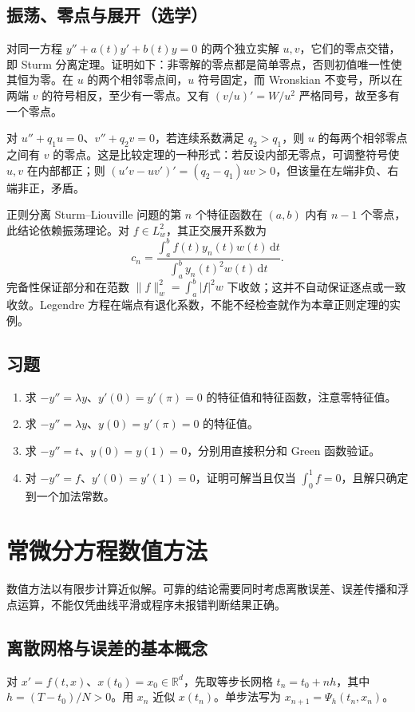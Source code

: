 \documentclass[UTF8,12pt,a4paper,fontset=fandol]{ctexbook}
\begin{document}
\section{振荡、零点与展开（选学）}
对同一方程 $y''+a(t)y'+b(t)y=0$ 的两个独立实解 $u,v$，它们的零点交错，即 Sturm 分离定理。证明如下：非零解的零点都是简单零点，否则初值唯一性使其恒为零。在 $u$ 的两个相邻零点间，$u$ 符号固定，而 Wronskian 不变号，所以在两端 $v$ 的符号相反，至少有一零点。又有 $(v/u)'=W/u^2$ 严格同号，故至多有一个零点。

对 $u''+q_1u=0$、$v''+q_2v=0$，若连续系数满足 $q_2>q_1$，则 $u$ 的每两个相邻零点之间有 $v$ 的零点。这是比较定理的一种形式：若反设内部无零点，可调整符号使 $u,v$ 在内部都正；则 $(u'v-uv')'=(q_2-q_1)uv>0$，但该量在左端非负、右端非正，矛盾。

正则分离 Sturm--Liouville 问题的第 $n$ 个特征函数在 $(a,b)$ 内有 $n-1$ 个零点，此结论依赖振荡理论。对 $f\in L^2_w$，其正交展开系数为
\[
 c_n=\frac{\int_a^b f(t)y_n(t)w(t)\,\mathrm dt}{\int_a^b y_n(t)^2w(t)\,\mathrm dt}.
\]
完备性保证部分和在范数 $\|f\|_w^2=\int_a^b|f|^2w$ 下收敛；这并不自动保证逐点或一致收敛。Legendre 方程在端点有退化系数，不能不经检查就作为本章正则定理的实例。

\section{习题}
\begin{enumerate}
 \item\label{ex:ode-neumann} 求 $-y''=\lambda y$、$y'(0)=y'(\pi)=0$ 的特征值和特征函数，注意零特征值。
 \item\label{ex:ode-mixed} 求 $-y''=\lambda y$、$y(0)=y'(\pi)=0$ 的特征值。
 \item 求 $-y''=t$、$y(0)=y(1)=0$，分别用直接积分和 Green 函数验证。
 \item 对 $-y''=f$、$y'(0)=y'(1)=0$，证明可解当且仅当 $\int_0^1f=0$，且解只确定到一个加法常数。
\end{enumerate}

\chapter{常微分方程数值方法}
\label{chap:ode-numerical}

数值方法以有限步计算近似解。可靠的结论需要同时考虑离散误差、误差传播和浮点运算，不能仅凭曲线平滑或程序未报错判断结果正确。

\section{离散网格与误差的基本概念}
对 $x'=f(t,x)$、$x(t_0)=x_0\in\mathbb R^d$，先取等步长网格 $t_n=t_0+nh$，其中 $h=(T-t_0)/N>0$。用 $x_n$ 近似 $x(t_n)$。单步法写为 $x_{n+1}=\Psi_h(t_n,x_n)$。
\end{document}
